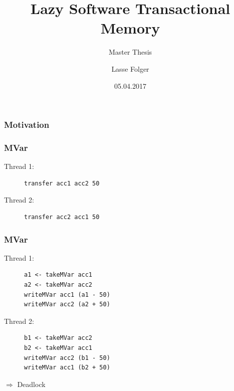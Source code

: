 \documentclass{beamer}
\author{Lasse Folger}
\title{\huge Lazy Software Transactional Memory}
\subtitle{Master Thesis}
\date{05.04.2017}
\begin{document}
  \begin{frame}[t,plain]
    \titlepage
  \end{frame}
  
  
  \begin{frame}
    \frametitle{Motivation}
    
  \end{frame}
  
  \begin{frame}[fragile]
    \frametitle{MVar}
    \fboxsep=0pt
    \noindent
    \begin{minipage}[t]{0.48\linewidth}
      Thread 1:
            \begin{figure}
       \begin{lstlisting}[frame=single]
transfer acc1 acc2 50
       \end{lstlisting}
      \end{figure}
\end{minipage}%
    \hfill%
    \begin{minipage}[t]{0.48\linewidth}
      Thread 2:      
      \begin{figure}
       \begin{lstlisting}[frame=single]
transfer acc2 acc1 50
       \end{lstlisting}
      \end{figure}
    \end{minipage}
\end{frame}

  \begin{frame}[fragile]
    \frametitle{MVar}
    \fboxsep=0pt
    \noindent
    \begin{minipage}[t]{0.48\linewidth}
      Thread 1:
            \begin{figure}
       \begin{lstlisting}[frame=single]
a1 <- takeMVar acc1 
a2 <- takeMVar acc2 
writeMVar acc1 (a1 - 50)
writeMVar acc2 (a2 + 50)
       \end{lstlisting}
      \end{figure}
\end{minipage}%
    \hfill%
    \begin{minipage}[t]{0.48\linewidth}
      Thread 2:      
      \begin{figure}
       \begin{lstlisting}[frame=single]
b1 <- takeMVar acc2 
b2 <- takeMVar acc1 
writeMVar acc2 (b1 - 50)
writeMVar acc1 (b2 + 50)
       \end{lstlisting}
      \end{figure}
    \end{minipage}
    \vfill
    \pause
    $\Rightarrow$ Deadlock
\end{frame}
  
\end{document}
